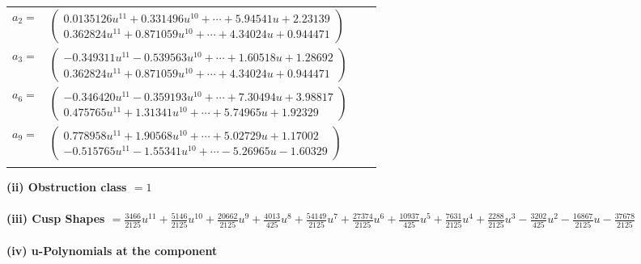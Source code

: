 \documentclass[1p]{elsarticle_modified}
\theoremstyle{definition}
\begin{document}
\begin{tabular}{m{7pt} m{180pt} m{7pt} m{180pt} }
\flushright $a_{2}=$&$\begin{pmatrix}0.0135126 u^{11}+0.331496 u^{10}+\cdots+5.94541 u+2.23139\\0.362824 u^{11}+0.871059 u^{10}+\cdots+4.34024 u+0.944471\end{pmatrix}$ \\
\flushright $a_{3}=$&$\begin{pmatrix}-0.349311 u^{11}-0.539563 u^{10}+\cdots+1.60518 u+1.28692\\0.362824 u^{11}+0.871059 u^{10}+\cdots+4.34024 u+0.944471\end{pmatrix}$ \\
\flushright $a_{6}=$&$\begin{pmatrix}-0.346420 u^{11}-0.359193 u^{10}+\cdots+7.30494 u+3.98817\\0.475765 u^{11}+1.31341 u^{10}+\cdots+5.74965 u+1.92329\end{pmatrix}$ \\
\flushright $a_{9}=$&$\begin{pmatrix}0.778958 u^{11}+1.90568 u^{10}+\cdots+5.02729 u+1.17002\\-0.515765 u^{11}-1.55341 u^{10}+\cdots-5.26965 u-1.60329\end{pmatrix}$\\&\end{tabular}
\flushleft \textbf{(ii) Obstruction class $= 1$}\\~\\
\flushleft \textbf{(iii) Cusp Shapes $= \frac{3466}{2125} u^{11}+\frac{5146}{2125} u^{10}+\frac{20662}{2125} u^9+\frac{4013}{425} u^8+\frac{54149}{2125} u^7+\frac{27374}{2125} u^6+\frac{10937}{425} u^5+\frac{7631}{2125} u^4+\frac{2288}{2125} u^3-\frac{3202}{425} u^2-\frac{16867}{2125} u-\frac{37678}{2125}$}\\~\\
\newpage\renewcommand{\arraystretch}{1}
\flushleft \textbf{(iv) u-Polynomials at the component}\newline \\
\end{document}
